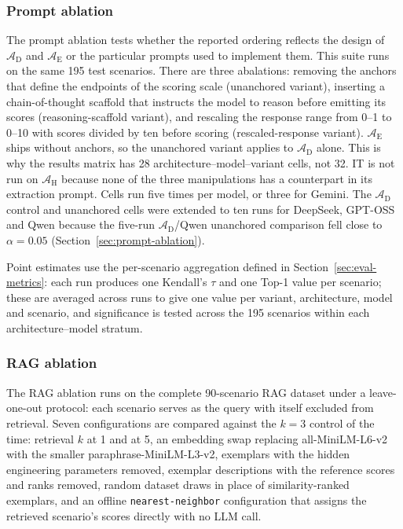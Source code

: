 \documentclass[final,3p,times]{elsarticle}
\begin{document}
\subsubsection{Prompt ablation}
\label{sec:prompt-ablation-methods}
The prompt ablation tests whether the reported ordering reflects the design of $\mathcal{A}_{\text{D}}$ and $\mathcal{A}_{\text{E}}$ or the particular prompts used to implement them. This suite runs on the same 195 test scenarios. There are three abalations: removing the anchors that define the endpoints of the scoring scale (unanchored variant), inserting a chain-of-thought scaffold that instructs the model to reason before emitting its scores (reasoning-scaffold variant), and rescaling the response range from 0--1 to 0--10 with scores divided by ten before scoring (rescaled-response variant). $\mathcal{A}_{\text{E}}$ ships without anchors, so the unanchored variant applies to $\mathcal{A}_{\text{D}}$ alone. This is why the results matrix has 28 architecture--model--variant cells, not 32. IT is not run on $\mathcal{A}_{\text{H}}$ because none of the three manipulations has a counterpart in its extraction prompt. Cells run five times per model, or three for Gemini. The $\mathcal{A}_{\text{D}}$ control and unanchored cells were extended to ten runs for DeepSeek, GPT-OSS and Qwen because the five-run $\mathcal{A}_{\text{D}}$/Qwen unanchored comparison fell close to $\alpha = 0.05$ (Section~\ref{sec:prompt-ablation}).

Point estimates use the per-scenario aggregation defined in Section~\ref{sec:eval-metrics}: each run produces one Kendall's $\tau$ and one Top-1 value per scenario; these are averaged across runs to give one value per variant, architecture, model and scenario, and significance is tested across the 195 scenarios within each architecture--model stratum.

\subsubsection{RAG ablation}
\label{sec:rag-ablation-methods}
The RAG ablation runs on the complete 90-scenario RAG dataset under a leave-one-out protocol: each scenario serves as the query with itself excluded from retrieval. Seven configurations are compared against the $k=3$ control of the time: retrieval $k$ at 1 and at 5, an embedding swap replacing all-MiniLM-L6-v2 with the smaller paraphrase-MiniLM-L3-v2, exemplars with the hidden engineering parameters removed, exemplar descriptions with the reference scores and ranks removed, random dataset draws in place of similarity-ranked exemplars, and an offline \texttt{nearest-neighbor} configuration that assigns the retrieved scenario's scores directly with no LLM call.
\end{document}

